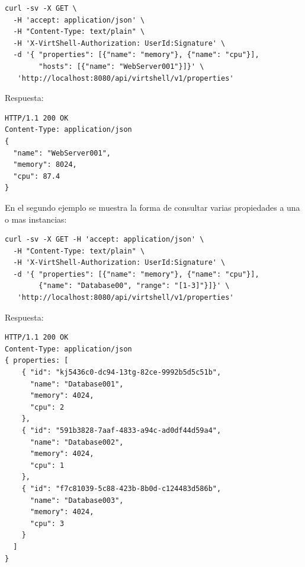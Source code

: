 \begin{lstlisting}[style=json, caption=Ejemplo consultando varias propiedades a una instancia]
curl -sv -X GET \
  -H 'accept: application/json' \
  -H "Content-Type: text/plain" \
  -H 'X-VirtShell-Authorization: UserId:Signature' \
  -d '{ "properties": [{"name": "memory"}, {"name": "cpu"}],
        "hosts": [{"name": "WebServer001"}]}' \
   'http://localhost:8080/api/virtshell/v1/properties'
\end{lstlisting}


\vspace{5mm}

Respuesta:

\begin{lstlisting}[style=json, caption=Respuesta]
HTTP/1.1 200 OK
Content-Type: application/json
{
  "name": "WebServer001",
  "memory": 8024,
  "cpu": 87.4
}
\end{lstlisting}


\vspace{5mm}

En el segundo ejemplo se muestra la forma de consultar varias propiedades a una o mas instancias:

\vspace{3.5cm}

\begin{lstlisting}[style=json, caption=Ejemplo consultando propiedades a varias instancias]
curl -sv -X GET -H 'accept: application/json' \
  -H "Content-Type: text/plain" \
  -H 'X-VirtShell-Authorization: UserId:Signature' \
  -d '{ "properties": [{"name": "memory"}, {"name": "cpu"}],
        {"name": "Database00", "range": "[1-3]"}]}' \
   'http://localhost:8080/api/virtshell/v1/properties'
\end{lstlisting}

\vspace{5mm}

Respuesta:

\begin{lstlisting}[style=json, caption=Respuesta]
HTTP/1.1 200 OK
Content-Type: application/json
{ properties: [
    { "id": "kj5436c0-dc94-13tg-82ce-9992b5d5c51b",
      "name": "Database001",
      "memory": 4024,
      "cpu": 2
    },
    { "id": "591b3828-7aaf-4833-a94c-ad0df44d59a4",
      "name": "Database002",
      "memory": 4024,
      "cpu": 1  
    },
    { "id": "f7c81039-5c88-423b-8b0d-c124483d586b",
      "name": "Database003",
      "memory": 4024,
      "cpu": 3  
    }
  ]  
}
\end{lstlisting}
